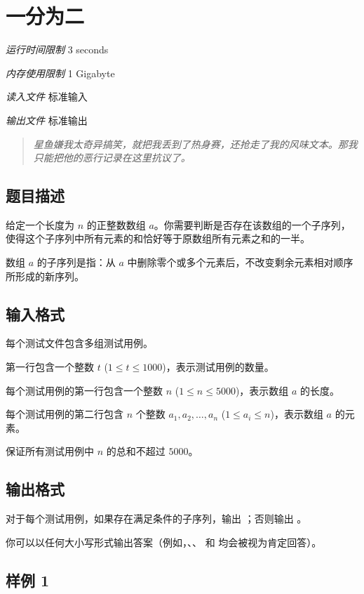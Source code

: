 \section[A. 一分为二]{ 一分为二}

\textit{运行时间限制}   3 seconds

\textit{内存使用限制} 1 Gigabyte

\textit{读入文件} \qquad 标准输入

\textit{输出文件} \qquad 标准输出

\begin{quote}
\textit{星鱼嫌我太奇异搞笑，就把我丢到了热身赛，还抢走了我的风味文本。那我只能把他的恶行记录在这里抗议了。}
\end{quote}

\subsection{题目描述}

给定一个长度为 $n$ 的正整数数组 $a$。你需要判断是否存在该数组的一个子序列，使得这个子序列中所有元素的和恰好等于原数组所有元素之和的一半。

数组 $a$ 的子序列是指：从 $a$ 中删除零个或多个元素后，不改变剩余元素相对顺序所形成的新序列。

\subsection{输入格式}

每个测试文件包含多组测试用例。

第一行包含一个整数 $t$ ($1 \le t \le 1000$)，表示测试用例的数量。

每个测试用例的第一行包含一个整数 $n$ ($1 \le n \le 5000$)，表示数组 $a$ 的长度。

每个测试用例的第二行包含 $n$ 个整数 $a_1, a_2, \dots, a_n$ ($1 \le a_i \le n$)，表示数组 $a$ 的元素。

保证所有测试用例中 $n$ 的总和不超过 $5000$。

\subsection{输出格式}

对于每个测试用例，如果存在满足条件的子序列，输出 ；否则输出 。

你可以以任何大小写形式输出答案（例如，、、 和  均会被视为肯定回答）。

\subsection{样例 1}

